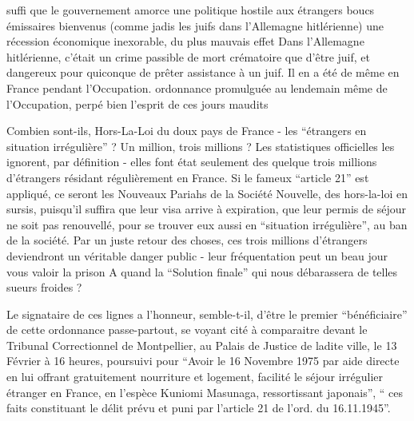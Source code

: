 suffi que le gouvernement amorce une politique hostile aux étrangers
 boucs émissaires bienvenus (comme jadis les juifs dans l'Allemagne hitlérienne)
 une récession économique inexorable, du plus mauvais effet
Dans l'Allemagne hitlérienne, c'était un crime passible de mort
crématoire que d'être juif, et dangereux pour quiconque de prêter assistance
à un juif. Il en a été de même en France pendant l'Occupation. 
ordonnance\unsure{,} 
promulguée au lendemain même de l'Occupation, perpé bien l'esprit de ces jours maudits

Combien sont-ils,  Hors-La-Loi du doux pays de France -
les ``étrangers en situation irrégulière'' ? Un million, trois millions ?
Les statistiques officielles les ignorent, par définition - elles font
état seulement des quelque trois millions d'étrangers résidant régulièrement
en France. Si le fameux ``article 21'' est appliqué, ce seront  les
Nouveaux Pariahs de la Société Nouvelle, des hors-la-loi en sursis,
puisqu'il suffira que leur visa arrive à expiration, que leur permis de
séjour ne soit pas renouvellé, pour se trouver eux aussi en ``situation
irrégulière'', au ban de la société. Par un juste retour des choses, ces
trois millions d'étrangers deviendront un véritable danger public - leur
fréquentation peut un beau jour vous valoir la prison\handwritten{!} A quand la ``Solution
finale'' qui nous débarassera de telles sueurs froides ?

Le signataire de ces lignes a l'honneur, semble-t-il, d'être le premier
``bénéficiaire'' de cette ordonnance passe-partout, se voyant cité à
comparaitre devant le Tribunal Correctionnel de Montpellier, au Palais de
Justice de ladite ville, le 13 Février à 16 heures, poursuivi pour ``Avoir
le 16 Novembre 1975 par aide directe en lui offrant gratuitement nourriture
et logement, facilité le séjour irrégulier  étranger en France, en
l'espèce Kuniomi Masunaga, ressortissant japonais'', `` ces faits constituant
le délit prévu et puni par l'article 21 de l'ord. du 16.11.1945''.


